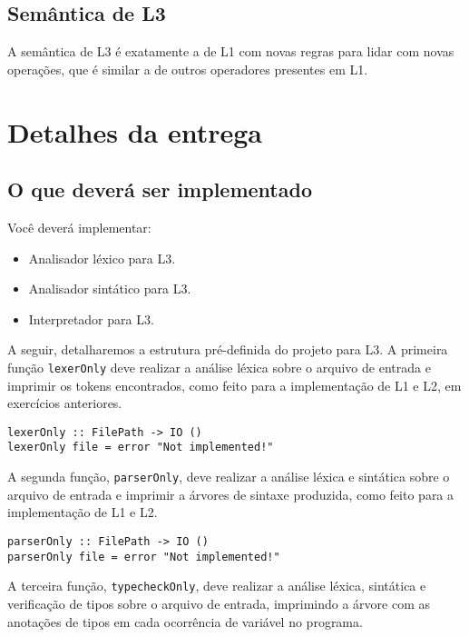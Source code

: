 \documentclass[a4paper,11pt]{article}
\begin{document}
\subsection*{Semântica de L3}
\label{sec:orgda3b6d8}

A semântica de L3 é exatamente a de L1 com novas regras para lidar com novas operações, que
é similar a de outros operadores presentes em L1.
\section*{Detalhes da entrega}
\label{sec:org77830f5}

\subsection*{O que deverá ser implementado}
\label{sec:org55f3f6b}

Você deverá implementar:

\begin{itemize}
\item Analisador léxico para L3.

\item Analisador sintático para L3.

\item Interpretador para L3.
\end{itemize}

A seguir, detalharemos a estrutura pré-definida do projeto para L3.
A primeira função \texttt{lexerOnly} deve realizar a análise léxica sobre o
arquivo de entrada e imprimir os tokens encontrados, como feito para a
implementação de L1 e L2, em exercícios anteriores.

\begin{verbatim}
lexerOnly :: FilePath -> IO ()
lexerOnly file = error "Not implemented!"
\end{verbatim}

A segunda função, \texttt{parserOnly}, deve realizar a análise léxica e sintática sobre o
arquivo de entrada e imprimir a árvores de sintaxe produzida, como feito para a
implementação de L1 e L2.

\begin{verbatim}
parserOnly :: FilePath -> IO ()
parserOnly file = error "Not implemented!"
\end{verbatim}

A terceira função, \texttt{typecheckOnly}, deve realizar a análise léxica, sintática e
verificação de tipos sobre o arquivo de entrada, imprimindo a árvore com as anotações
de tipos em cada ocorrência de variável no programa.
\end{document}
